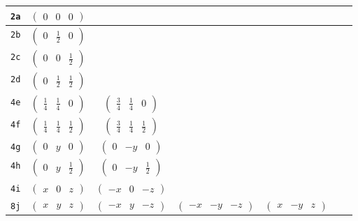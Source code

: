 \documentclass[fleqn,9pt,landscape]{jsarticle}
\begin{document}
\begin{center}
\begin{longtable}{ccccccc}
{\tt 2a} & $ \begin{pmatrix} 0 & 0 & 0 \end{pmatrix} $ & $  $ & $  $ & $  $ \\ \hline
{\tt 2b} & $ \begin{pmatrix} 0 & \frac{1}{2} & 0 \end{pmatrix} $ & $  $ & $  $ & $  $ \\ \hline
{\tt 2c} & $ \begin{pmatrix} 0 & 0 & \frac{1}{2} \end{pmatrix} $ & $  $ & $  $ & $  $ \\ \hline
{\tt 2d} & $ \begin{pmatrix} 0 & \frac{1}{2} & \frac{1}{2} \end{pmatrix} $ & $  $ & $  $ & $  $ \\ \hline
{\tt 4e} & $ \begin{pmatrix} \frac{1}{4} & \frac{1}{4} & 0 \end{pmatrix} $ & $ \begin{pmatrix} \frac{3}{4} & \frac{1}{4} & 0 \end{pmatrix} $ & $  $ & $  $ \\ \hline
{\tt 4f} & $ \begin{pmatrix} \frac{1}{4} & \frac{1}{4} & \frac{1}{2} \end{pmatrix} $ & $ \begin{pmatrix} \frac{3}{4} & \frac{1}{4} & \frac{1}{2} \end{pmatrix} $ & $  $ & $  $ \\ \hline
{\tt 4g} & $ \begin{pmatrix} 0 & y & 0 \end{pmatrix} $ & $ \begin{pmatrix} 0 & - y & 0 \end{pmatrix} $ & $  $ & $  $ \\ \hline
{\tt 4h} & $ \begin{pmatrix} 0 & y & \frac{1}{2} \end{pmatrix} $ & $ \begin{pmatrix} 0 & - y & \frac{1}{2} \end{pmatrix} $ & $  $ & $  $ \\ \hline
{\tt 4i} & $ \begin{pmatrix} x & 0 & z \end{pmatrix} $ & $ \begin{pmatrix} - x & 0 & - z \end{pmatrix} $ & $  $ & $  $ \\ \hline
{\tt 8j} & $ \begin{pmatrix} x & y & z \end{pmatrix} $ & $ \begin{pmatrix} - x & y & - z \end{pmatrix} $ & $ \begin{pmatrix} - x & - y & - z \end{pmatrix} $ & $ \begin{pmatrix} x & - y & z \end{pmatrix} $ \\
\end{longtable}
\end{center}
\end{document}
